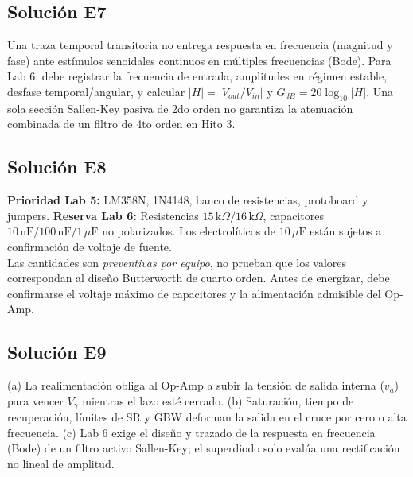 \documentclass[10pt, a4paper]{article}
\begin{document}
\subsection*{Solución E7}
Una traza temporal transitoria no entrega respuesta en frecuencia (magnitud y fase) ante estímulos senoidales continuos en múltiples frecuencias (Bode). Para Lab 6: debe registrar la frecuencia de entrada, amplitudes en régimen estable, desfase temporal/angular, y calcular $|H|=|V_{out}/V_{in}|$ y $G_{dB} = 20\log_{10}|H|$. Una sola sección Sallen-Key pasiva de 2do orden no garantiza la atenuación combinada de un filtro de 4to orden en Hito 3.

\subsection*{Solución E8}
\textbf{Prioridad Lab 5:} LM358N, 1N4148, banco de resistencias, protoboard y jumpers. \textbf{Reserva Lab 6:} Resistencias $15\,\text{k}\Omega / 16\,\text{k}\Omega$, capacitores $10\,\text{nF} / 100\,\text{nF} / 1\,\mu\text{F}$ no polarizados. Los electrolíticos de $10\,\mu\text{F}$ están sujetos a confirmación de voltaje de fuente. \\
Las cantidades son \textit{preventivas por equipo}, no prueban que los valores correspondan al diseño Butterworth de cuarto orden. Antes de energizar, debe confirmarse el voltaje máximo de capacitores y la alimentación admisible del Op-Amp.

\subsection*{Solución E9}
(a) La realimentación obliga al Op-Amp a subir la tensión de salida interna ($v_a$) para vencer $V_\gamma$ mientras el lazo esté cerrado. (b) Saturación, tiempo de recuperación, límites de SR y GBW deforman la salida en el cruce por cero o alta frecuencia. (c) Lab 6 exige el diseño y trazado de la respuesta en frecuencia (Bode) de un filtro activo Sallen-Key; el superdiodo solo evalúa una rectificación no lineal de amplitud.
\end{document}
